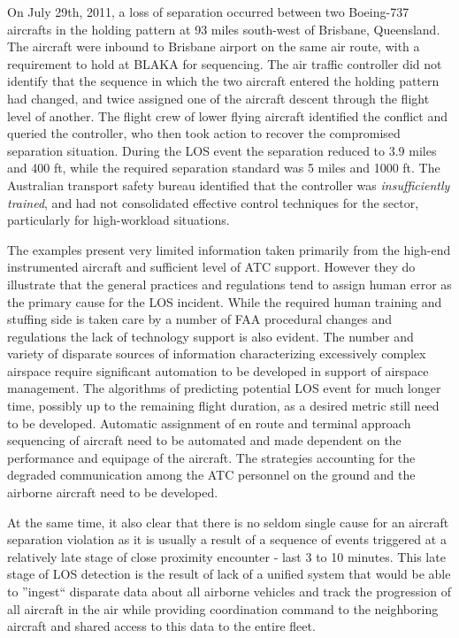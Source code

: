 \documentclass[letter,onecolumn,12pt]{aiaa-tc}
\newcommand{\1}{1_n}
\begin{document}
On July 29th, 2011, a loss of separation occurred between two Boeing-737 aircrafts in the holding pattern at 93 miles south-west of Brisbane, Queensland\cite{Brisbane_ATSR2011}. The aircraft were inbound to Brisbane airport on the same air route, with a requirement to hold at BLAKA for sequencing. The air traffic controller did not identify that the sequence in which the two aircraft entered the holding pattern had changed, and twice assigned one of the aircraft descent through the flight level of another. The flight crew of lower flying aircraft identified the conflict and queried the controller, who then took action to recover the compromised separation situation. During the LOS event the separation reduced to 3.9 miles and 400 ft, while the required separation standard was 5 miles and 1000 ft. The Australian transport safety bureau identified that the controller was \emph{insufficiently trained}, and had not consolidated effective control techniques for the sector, particularly for high-workload situations.

The examples present very limited information taken primarily from the high-end instrumented aircraft and sufficient level of ATC support. However they do illustrate that the general practices and regulations tend to assign human error as the primary cause for the LOS incident. While the required human training and stuffing side is taken care by a number of FAA procedural changes and regulations\cite{OIG_AR2013} the lack of technology support is also evident. The number and variety of disparate sources of information characterizing excessively complex airspace require significant automation to be developed in support of airspace management. The algorithms of predicting potential LOS event for much longer time, possibly up to the remaining flight duration, as a desired metric still need to be developed. Automatic assignment of en route and terminal approach sequencing of aircraft need to be automated and made dependent on the performance and equipage of the aircraft. The strategies accounting for the degraded communication among the ATC personnel on the ground and the airborne aircraft need to be developed.

At the same time, it also clear that there is no seldom single cause for an aircraft separation violation as it is usually a result of  a sequence of events triggered at a relatively late stage of close proximity encounter - last 3 to 10 minutes. This late stage of LOS detection is the result of lack of a unified system that would be able to ''ingest`` disparate data about all airborne vehicles and track the progression of all aircraft in the air while providing coordination command to the neighboring aircraft and shared access to this data to the entire fleet.
\end{document}
